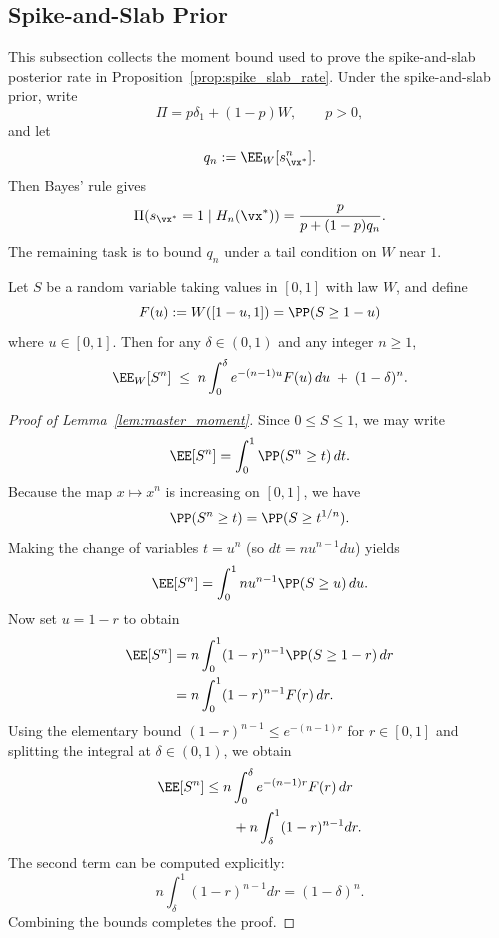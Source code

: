 \subsection{Spike-and-Slab Prior}
This subsection collects the moment bound used to prove the spike-and-slab
posterior rate in Proposition~\ref{prop:spike_slab_rate}.
Under the spike-and-slab prior, write
\[
\Pi = p\delta_1+(1-p)W,\qquad p>0,
\]
and let
\[
q_n:=\EE_W[s_{\vx^*}^n].
\]
Then Bayes' rule gives
\[
\Pi(s_{\vx^*}=1\mid H_n(\vx^*))
=
\frac{p}{p+(1-p)q_n}.
\]
The remaining task is to bound $q_n$ under a tail condition on $W$ near $1$.

\begin{lemma}\label{lem:master_moment}
Let $S$ be a random variable taking values in $[0,1]$ with law $W$, and define
\[
F(u) := W([1-u,1]) = \PP(S \ge 1-u)
\]
where $u \in [0,1]$. Then for any $\delta \in (0,1)$ and any integer $n \ge 1$,
\[
\EE_W[S^n]
\;\le\;
n \int_0^\delta e^{-(n-1)u} F(u)\,du
\;+\;
(1-\delta)^n.
\]
\end{lemma}
\label{proof:master_moment}
\begin{proof}[Proof of Lemma~\ref{lem:master_moment}]
Since $0 \le S \le 1$, we may write
\[
\EE[S^n]
=\int_0^1 \PP(S^n \ge t)\,dt.
\]
Because the map $x \mapsto x^n$ is increasing on $[0,1]$, we have
\[
\PP(S^n \ge t) = \PP(S \ge t^{1/n}).
\]
Making the change of variables $t = u^n$ (so $dt = n u^{n-1} du$) yields
\[
\EE[S^n]
=\int_0^1 n u^{n-1} \PP(S \ge u)\,du.
\]
Now set $u = 1 - r$ to obtain
\[
\begin{aligned}
\EE[S^n]
&=n \int_0^1 (1-r)^{n-1}
\PP(S \ge 1-r)\,dr\\
&=n \int_0^1 (1-r)^{n-1}F(r)\,dr.
\end{aligned}
\]
Using the elementary bound $(1-r)^{n-1} \le e^{-(n-1)r}$ for $r \in [0,1]$ and splitting the
integral at $\delta \in (0,1)$, we obtain
\[
\begin{aligned}
\EE[S^n]
&\le n \int_0^\delta e^{-(n-1)r}F(r)\,dr\\
&\qquad{}+n \int_\delta^1 (1-r)^{n-1}dr.
\end{aligned}
\]
The second term can be computed explicitly:
\[
n \int_\delta^1 (1-r)^{n-1} dr = (1-\delta)^n.
\]
Combining the bounds completes the proof.
\end{proof}

